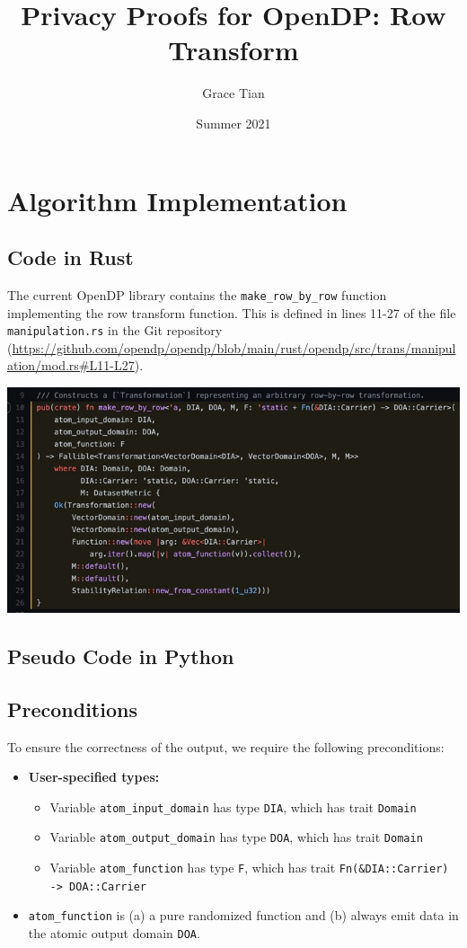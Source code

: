 \documentclass[11pt,a4paper]{article}
\title{Privacy Proofs for OpenDP: Row Transform}
\author{Grace Tian}
\date{Summer 2021}
\begin{document}
\maketitle
\tableofcontents


\section{Algorithm Implementation}
\subsection{Code in Rust}
The current OpenDP library contains the \texttt{make\_row\_by\_row} function implementing the row transform function. This is defined in lines 11-27 of the file \texttt{manipulation.rs} in the Git repository (\url{https://github.com/opendp/opendp/blob/main/rust/opendp/src/trans/manipulation/mod.rs#L11-L27}).

\includegraphics[width=\textwidth]{make_row_by_row.jpg}


\subsection{Pseudo Code in Python} \label{sec:pseudocode}

\subsection*{Preconditions}
To ensure the correctness of the output, we require the following preconditions:

\begin{itemize}
    \item \textbf{User-specified types:}
    \begin{itemize}
        \item Variable \texttt{atom\_input\_domain} has type \texttt{DIA}, which has trait \texttt{Domain}
        \item Variable \texttt{atom\_output\_domain} has type \texttt{DOA}, which has trait \texttt{Domain}
        \item Variable \texttt{atom\_function} has type \texttt{F}, which has trait \texttt{Fn(\&DIA::Carrier) -> DOA::Carrier}
    \end{itemize}
    \item \texttt{atom\_function} is (a) a pure randomized function and (b) always emit data in the atomic output domain \texttt{DOA}.
\end{itemize}
\end{document}

